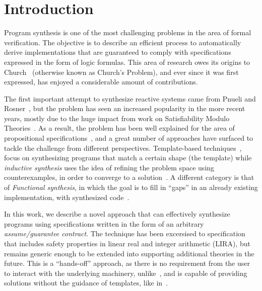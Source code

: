 
\section{Introduction}

Program synthesis is one of the most challenging problems in the area of formal verification. The objective is to describe an efficient process to automatically derive implementations that are guaranteed to comply with specifications expressed in the form of logic formulas. This area of research owes its origins to Church~\cite{church1962logic} (otherwise known as Church's Problem), and ever since it was first expressed, has enjoyed a considerable amount of contributions.

The first important attempt to synthesize reactive systems came from Pnueli and Rosner~\cite{pnueli1989synthesis}, but the problem has seen an increased popularity in the more recent years, mostly due to the huge impact from work on Satisfiability Modulo Theories~\cite{BarFT-SMTLIB}. As a result, the problem has been well explained for the area of propositional specifications~\cite{gulwani2010dimensions}, and a great number of approaches have surfaced to tackle the challenge from different perspectives. Template-based techniques~\cite{srivastava2013template}, focus on synthesizing programs that
match a certain shape (the template) while {\em inductive synthesis} uses the idea of refining the problem space using counterexamples, in order to converge to a solution~\cite{flener2001inductive}. A different category is that of \textit{Functional synthesis}, in which the goal is to fill in ``gaps'' in an already existing implementation, with synthesized code~\cite{kuncak2013functional}.

In this work, we describe a novel approach that can effectively synthesize
programs using specifications written in the form of an arbitrary {\em
assume/guarantee contract}. The technique has been excersised to specification
that includes safety properties in linear real and integer arithmetic (LIRA),
but remains generic enough to be extended into supporting additional theories
in the future. This is a ``hands-off'' approach, as there is no
requirement from the user to interact with the underlying machinery,
unlike~\cite{ryzhyk2014user,ryzhyk2016developing}, and is capable of providing solutions without the guidance of templates, like
in~\cite{beyene2014constraint}.

